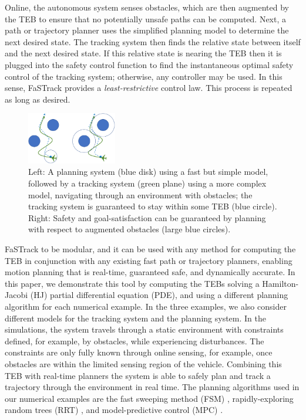 Online, the autonomous system senses obstacles, which are then augmented by the TEB to ensure that no potentially unsafe paths can be computed. 
Next, a path or trajectory planner uses the simplified planning model to determine the next desired state. 
The tracking system then finds the relative state between itself and the next desired state. 
If this relative state is nearing the TEB then it is plugged into the safety control function to find the instantaneous optimal safety control of the tracking system; otherwise, any controller may be used. In this sense, FaSTrack provides a \emph{least-restrictive} control law. 
This process is repeated as long as desired. 
  
\begin{figure}
	\centering
	\includegraphics[width=0.35\textwidth]{fig/chasing}
	\caption{Left: A planning system (blue disk) using a fast but simple model, followed by a tracking system (green plane) using a more complex model, navigating through an environment with obstacles; the tracking system is guaranteed to stay within some TEB (blue circle). Right: Safety and goal-satisfaction can be guaranteed by planning with respect to augmented obstacles (large blue circles).}
	\label{fig:chasing}
\end{figure}
%

FaSTrack to be modular, and it can be used with any method for computing the TEB in conjunction with any existing fast path or trajectory planners, enabling motion planning that is real-time, guaranteed safe, and dynamically accurate. 
In this paper, we demonstrate this tool by computing the TEBs solving a Hamilton-Jacobi (HJ) partial differential equation (PDE), and using a different planning algorithm for each numerical example. 
In the three examples, we also consider different models for the tracking system and the planning system.
In the simulations, the system travels through a static environment with constraints defined, for example, by obstacles, while experiencing disturbances.
The constraints are only fully known through online sensing, for example, once obstacles are within the limited sensing region of the vehicle. 
Combining this TEB with real-time planners the system is able to safely plan and track a trajectory through the environment in real time. 
The planning algorithms used in our numerical examples are the fast sweeping method (FSM) \cite{Takei2013}, rapidly-exploring random trees (RRT) \cite{Kuffner2000,Kavraki1996}, and model-predictive control (MPC) \cite{Qin2003}.